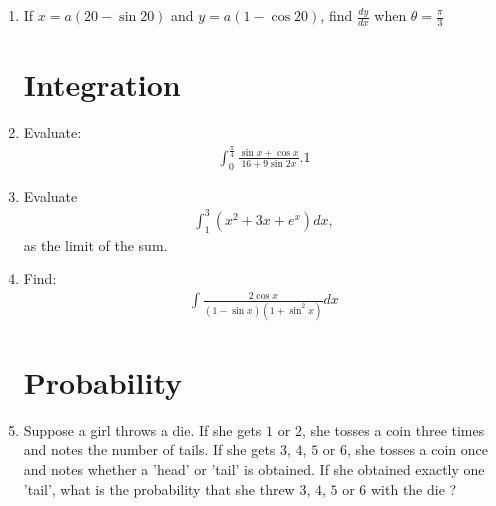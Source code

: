 \documentclass[10pt,-letter paper]{article}
\providecommand{\brak}[1]{\ensuremath{\left(#1\right)}}
\begin{document}
\begin{enumerate}
 \item If $x=a\brak{20-\sin 20}$ and $y=a\brak{1-\cos 20}$, find $\frac{dy}{dx}$ when $\theta=\frac{\pi}{3}$
\section{Integration}
\item Evaluate: 
\begin{align*}
	\int_{0}^{\frac{\pi}{4}}\frac{\sin x+\cos x}{16+9 \sin 2x}.1
\end{align*}
\item Evaluate 
	\begin{align*}
		\int_{1}^{3} \brak{x^{2}+3x+e^{x}}dx,
	\end{align*}
	as the limit of the sum.
\item Find:
	\begin{align*}
		\int\frac{2\cos x}{\brak{1-\sin x}\brak{1+\sin^{2}x}}dx
	\end{align*}
 
 \section{Probability}
\item  Suppose a girl throws a die. If she gets $1$ or $2$, she tosses a coin three times and notes the number of tails. If she gets $3$, $4$, $5$ or $6$, she tosses a coin once and notes whether a 'head' or 'tail' is obtained. If she obtained exactly one 'tail', what is the probability that she threw $3$, $4$, $5$ or $6$ with the die ? 



\end{enumerate}
\end{document}
